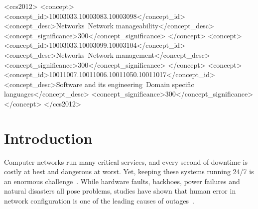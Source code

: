\documentclass[numbers, 10pt]{sigplanconf}
\begin{document}
%
%
%
%

\begin{CCSXML}
<ccs2012>
<concept>
<concept_id>10003033.10003083.10003098</concept_id>
<concept_desc>Networks~Network manageability</concept_desc>
<concept_significance>300</concept_significance>
</concept>
<concept>
<concept_id>10003033.10003099.10003104</concept_id>
<concept_desc>Networks~Network management</concept_desc>
<concept_significance>300</concept_significance>
</concept>
<concept>
<concept_id>10011007.10011006.10011050.10011017</concept_id>
<concept_desc>Software and its engineering~Domain specific languages</concept_desc>
<concept_significance>300</concept_significance>
</concept>
</ccs2012>
\end{CCSXML}
%




%
%
%
%

\section{Introduction} \label{sec:introduction}




Computer networks run many critical services, and every second of downtime is
costly at best and dangerous at worst.  Yet, keeping these systems
running 24/7 is an enormous
challenge~\cite{mahajan+:bgp-misconfiguration,feamster+:rcc,batfish,dc-failure-study}.
%
While hardware faults, backhoes, power failures and natural disasters all pose
problems, studies have shown that human error in network
configuration is one of the leading causes of
outages~\cite{juniper-study,yankee-study}.
\end{document}
